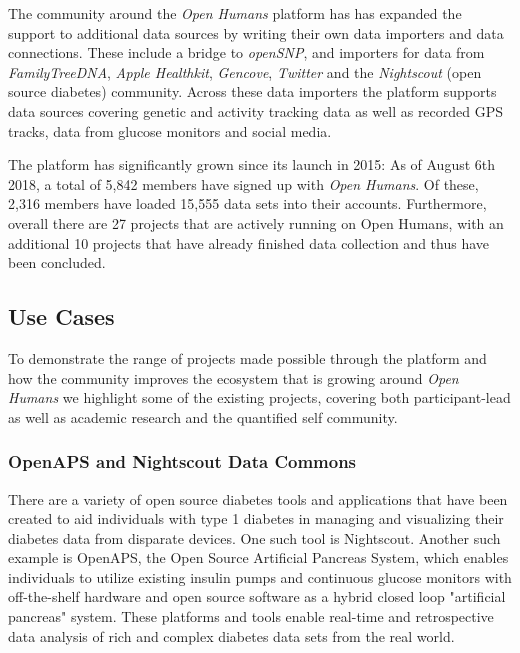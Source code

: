 \documentclass[a4paper,num-refs]{oup-contemporary}
\begin{document}
The community around the \textit{Open Humans} platform has has expanded the support to additional data sources by writing their own data importers and data connections. These include a bridge to \textit{openSNP}, and importers for data from \textit{FamilyTreeDNA}, \textit{Apple Healthkit}, \textit{Gencove}, \textit{Twitter} and the \textit{Nightscout} (open source diabetes) community. Across these data importers the platform supports data sources covering genetic and activity tracking data as well as recorded GPS tracks, data from glucose monitors and social media.

The platform has significantly grown since its launch in 2015: As of August 6th 2018, a total of 5,842 members have signed up with \textit{Open Humans}. Of these, 2,316 members have loaded 15,555 data sets into their accounts. Furthermore, overall there are 27 projects that are actively running on Open Humans, with an additional 10 projects that have already finished data collection and thus have been concluded.

\subsection{Use Cases}
To demonstrate the range of projects made possible through the platform and how the community improves the ecosystem that is growing around \textit{Open Humans} we highlight some of the existing projects, covering both participant-lead as well as academic research and the quantified self community.

\subsubsection{OpenAPS and Nightscout Data Commons}
There are a variety of open source diabetes tools and applications that have been created to aid individuals with type 1 diabetes in managing and visualizing their diabetes data from disparate devices. One such tool is Nightscout. Another such example is OpenAPS, the Open Source Artificial Pancreas System, which enables individuals to utilize existing insulin pumps and continuous glucose monitors with off-the-shelf hardware and open source software as a hybrid closed loop "artificial pancreas" system. These platforms and tools enable real-time and retrospective data analysis of rich and complex diabetes data sets from the real world. 
\end{document}

